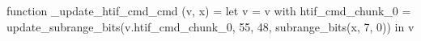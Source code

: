 function _update_htif_cmd_cmd (v, x) = let v = { v with htif_cmd_chunk_0 = update_subrange_bits(v.htif_cmd_chunk_0, 55, 48, subrange_bits(x, 7, 0)) } in
  v
